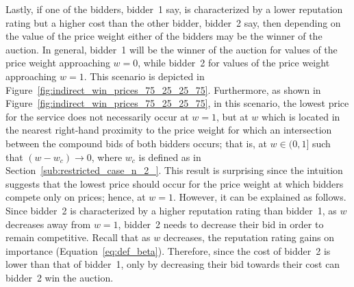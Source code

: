 Lastly, if one of the bidders, bidder~1 say, is characterized by a lower reputation rating but a higher cost than the other bidder, bidder~2 say, then depending on the value of the price weight either of the bidders may be the winner of the auction. In general, bidder~1 will be the winner of the auction for values of the price weight approaching $w=0$, while bidder~2 for values of the price weight approaching $w=1$. This scenario is depicted in Figure~\ref{fig:indirect_win_prices_75_25_25_75}. Furthermore, as shown in Figure~\ref{fig:indirect_win_prices_75_25_25_75}, in this scenario, the lowest price for the service does not necessarily occur at $w=1$, but at $w$ which is located in the nearest right-hand proximity to the price weight for which an intersection between the compound bids of both bidders occurs; that is, at $w\in (0,1]$ such that $(w - w_c)\to 0$, where $w_c$ is defined as in Section~\ref{sub:restricted_case_n_2_}. This result is surprising since the intuition suggests that the lowest price should occur for the price weight at which bidders compete only on prices; hence, at $w=1$. However, it can be explained as follows. Since bidder~2 is characterized by a higher reputation rating than bidder~1, as $w$ decreases away from $w=1$, bidder~2 needs to decrease their bid in order to remain competitive. Recall that as $w$ decreases, the reputation rating gains on importance (Equation~\eqref{eq:def_beta}). Therefore, since the cost of bidder~2 is lower than that of bidder~1, only by decreasing their bid towards their cost can bidder~2 win the auction.

